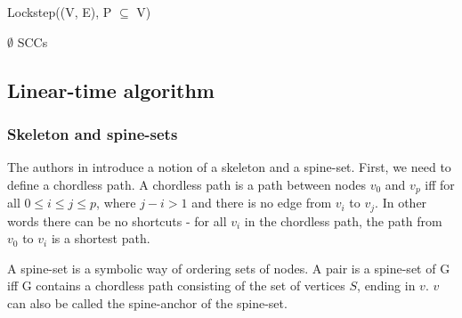 \documentclass[../master/master.tex]{subfiles}
\begin{document}
\begin{algorithm}
  \caption{Lockstep((V, E), P $\subseteq$ V)}
  \begin{algorithmic}[1]
    \Statex
     \State \Return $\emptyset$
    \EndIf
    \Statex
    \Statex
    \EndWhile
    \Statex
    \Else
    \EndIf
    \Statex
    \EndWhile
    \Statex
    \State \Return SCCs
  \end{algorithmic}
\end{algorithm}

\subsection{Linear-time algorithm}
\subsubsection{Skeleton and spine-sets}
The authors in \cite{linear} introduce a notion of a skeleton and a spine-set. First, we need to define a chordless path. A chordless path is a path between nodes $v_0$ and $v_p$ iff for all $0\leq i \leq j \leq p$, where $j-i>1$ and there is no edge from $v_i$ to $v_j$. In other words there can be no shortcuts - for all $v_i$ in the chordless path, the path from $v_0$ to $v_i$ is a shortest path.

A spine-set is a symbolic way of ordering sets of nodes. A pair  is a spine-set of G iff G contains a chordless path consisting of the set of vertices $S$, ending in $v$. $v$ can also be called the spine-anchor of the spine-set.
\end{document}
